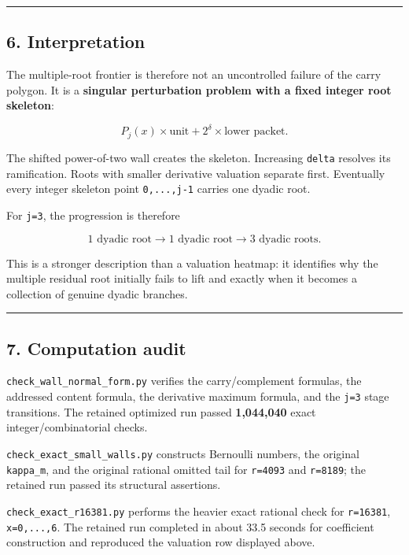 \documentclass[11pt,letterpaper]{article}
\begin{document}
\begin{center}\rule{0.5\linewidth}{0.5pt}\end{center}

\subsection{6. Interpretation}\label{interpretation}

The multiple-root frontier is therefore not an uncontrolled failure of the carry polygon. It is a \textbf{singular perturbation problem with a fixed integer root skeleton}:

\[
\boxed{
P_j(x)\times\text{unit}
+2^\delta\times\text{lower packet}.
}
\]

The shifted power-of-two wall creates the skeleton. Increasing \texttt{delta} resolves its ramification. Roots with smaller derivative valuation separate first. Eventually every integer skeleton point \texttt{0,...,j-1} carries one dyadic root.

For \texttt{j=3}, the progression is therefore

\[
\boxed{
1\text{ dyadic root}
\longrightarrow
1\text{ dyadic root}
\longrightarrow
3\text{ dyadic roots}.
}
\]

This is a stronger description than a valuation heatmap: it identifies why the multiple residual root initially fails to lift and exactly when it becomes a collection of genuine dyadic branches.

\begin{center}\rule{0.5\linewidth}{0.5pt}\end{center}

\subsection{7. Computation audit}\label{computation-audit}

\texttt{check\_wall\_normal\_form.py} verifies the carry/complement formulas, the addressed content formula, the derivative maximum formula, and the \texttt{j=3} stage transitions. The retained optimized run passed \textbf{1,044,040} exact integer/combinatorial checks.

\texttt{check\_exact\_small\_walls.py} constructs Bernoulli numbers, the original \texttt{kappa\_m}, and the original rational omitted tail for \texttt{r=4093} and \texttt{r=8189}; the retained run passed its structural assertions.

\texttt{check\_exact\_r16381.py} performs the heavier exact rational check for \texttt{r=16381}, \texttt{x=0,...,6}. The retained run completed in about 33.5 seconds for coefficient construction and reproduced the valuation row displayed above.
\end{document}
